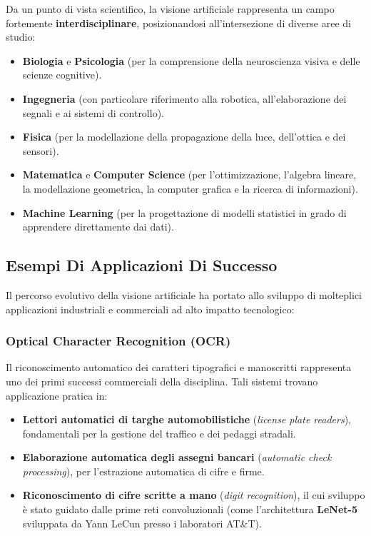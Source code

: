 ﻿\documentclass[11pt, a4paper]{article}
\begin{document}
Da un punto di vista scientifico, la visione artificiale rappresenta un campo fortemente \textbf{interdisciplinare}, posizionandosi all'intersezione di diverse aree di studio:
\begin{itemize}[noitemsep]
    \item \textbf{Biologia} e \textbf{Psicologia} (per la comprensione della neuroscienza visiva e delle scienze cognitive).
    \item \textbf{Ingegneria} (con particolare riferimento alla robotica, all'elaborazione dei segnali e ai sistemi di controllo).
    \item \textbf{Fisica} (per la modellazione della propagazione della luce, dell'ottica e dei sensori).
    \item \textbf{Matematica} e \textbf{Computer Science} (per l'ottimizzazione, l'algebra lineare, la modellazione geometrica, la computer grafica e la ricerca di informazioni).
    \item \textbf{Machine Learning} (per la progettazione di modelli statistici in grado di apprendere direttamente dai dati).
\end{itemize}


\subsection{Esempi Di Applicazioni Di Successo}

Il percorso evolutivo della visione artificiale ha portato allo sviluppo di molteplici applicazioni industriali e commerciali ad alto impatto tecnologico:

\subsubsection{Optical Character Recognition (OCR)}
Il riconoscimento automatico dei caratteri tipografici e manoscritti rappresenta uno dei primi successi commerciali della disciplina. Tali sistemi trovano applicazione pratica in:
\begin{itemize}[noitemsep]
    \item \textbf{Lettori automatici di targhe automobilistiche} (\emph{license plate readers}), fondamentali per la gestione del traffico e dei pedaggi stradali.
    \item \textbf{Elaborazione automatica degli assegni bancari} (\emph{automatic check processing}), per l'estrazione automatica di cifre e firme.
    \item \textbf{Riconoscimento di cifre scritte a mano} (\emph{digit recognition}), il cui sviluppo è stato guidato dalle prime reti convoluzionali (come l'architettura \textbf{LeNet-5} sviluppata da Yann LeCun presso i laboratori AT\&T).
\end{itemize}
\end{document}
